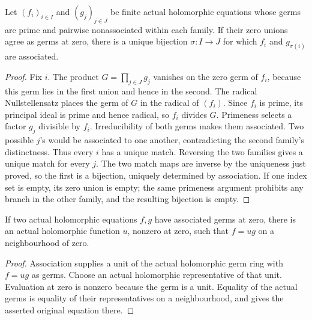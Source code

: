\begin{lemma}
\label{hir:equal-zero-unions-prime-branch-correspondence}
\leanok
Let $(f_i)_{i\in I}$ and $(g_j)_{j\in J}$ be finite actual holomorphic
equations whose germs are prime and pairwise nonassociated within each
family. If their zero unions agree as germs at zero, there is a unique
bijection $\sigma:I\to J$ for which $f_i$ and $g_{\sigma(i)}$ are
associated.
\end{lemma}
\begin{proof}
Fix $i$. The product $G=\prod_{j\in J}g_j$ vanishes on the zero germ of
$f_i$, because this germ lies in the first union and hence in the second.
The radical Nullstellensatz places the germ of $G$ in the radical of
$(f_i)$. Since $f_i$ is prime, its principal ideal is prime and hence
radical, so $f_i$ divides $G$. Primeness selects a factor $g_j$
divisible by $f_i$.
Irreducibility of both germs makes them associated. Two possible $j$'s
would be associated to one another, contradicting the second family's
distinctness. Thus every $i$ has a unique match. Reversing the two families
gives a unique match for every $j$. The two match maps are inverse by the
uniqueness just proved, so the first is a bijection, uniquely determined
by association. If one index set is
empty, its zero union is empty; the same primeness argument prohibits
any branch in the other family, and the resulting bijection is empty.
\end{proof}

\begin{lemma}
\label{hir:associated-original-equations-actual-unit}
\leanok
If two actual holomorphic equations $f,g$ have associated germs at zero,
there is an actual holomorphic function $u$, nonzero at zero, such that
$f=ug$ on a neighbourhood of zero.
\end{lemma}
\begin{proof}
Association supplies a unit of the actual holomorphic germ ring with
$f=ug$ as germs. Choose an actual holomorphic representative of that
unit. Evaluation at zero is nonzero because the germ is a unit. Equality
of the actual germs is equality of their representatives on a
neighbourhood, and gives the asserted original equation there.
\end{proof}

